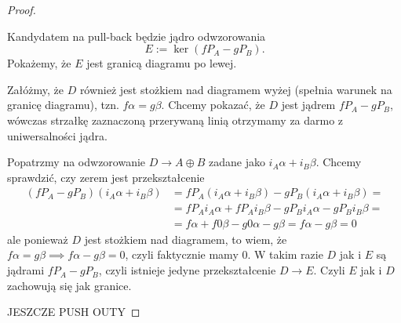 \begin{proof}
  \begin{center}\end{center}
  Kandydatem na pull-back będzie jądro odwzorowania
  $$E:=\ker(fP_A-gP_B).$$
  Pokażemy, że $E$ jest granicą diagramu po lewej.

  \begin{center}\end{center}
  Załóżmy, że $D$ również jest stożkiem nad diagramem wyżej (spełnia warunek na granicę diagramu), tzn. $f\alpha=g\beta$. Chcemy pokazać, że $D$ jest jądrem $fP_A-gP_B$, wówczas strzałkę zaznaczoną przerywaną linią otrzymamy za darmo z uniwersalności jądra.

  Popatrzmy na odwzorowanie $D\to A\oplus B$ zadane jako $i_A\alpha+i_B\beta$. Chcemy sprawdzić, czy zerem jest przekształcenie
  \begin{align*}
    (fP_A-gP_B)(i_A\alpha+i_B\beta)&=fP_A(i_A\alpha+i_B\beta)-gP_B(i_A\alpha+i_B\beta)=\\ 
                                   &=fP_Ai_A\alpha+fP_Ai_B\beta-gP_Bi_A\alpha-gP_Bi_B\beta=\\ 
                                   &=f\alpha+f0\beta - g0\alpha-g\beta=f\alpha-g\beta=0
  \end{align*}
  ale ponieważ $D$ jest stożkiem nad diagramem, to wiem, że $f\alpha=g\beta\implies f\alpha-g\beta=0$, czyli faktycznie mamy $0$. W takim razie $D$ jak i $E$ są jądrami $fP_A-gP_B$, czyli istnieje jedyne przekształcenie $D\to E$. Czyli $E$ jak i $D$ zachowują się jak granice. 

  {\large\color{red}JESZCZE PUSH OUTY}

\end{proof}

